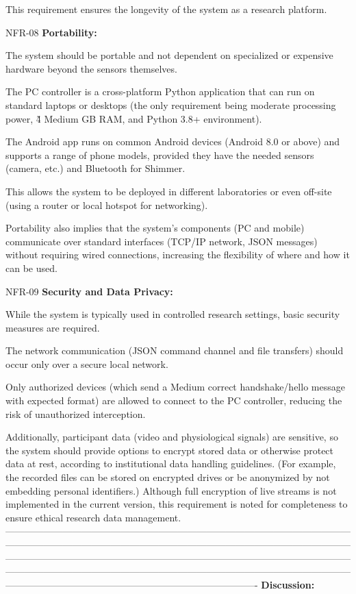 This requirement ensures the longevity of the system as a research platform.

NFR-08 \textbf{Portability:}

The system should be portable and not dependent on specialized or expensive hardware
beyond the sensors themselves.

The PC controller is a cross-platform Python application that can run on standard
laptops or desktops (the only requirement being moderate processing power, \~4 Medium
GB RAM, and Python 3.8+ environment).

The Android app runs on common Android devices (Android 8.0 or above) and supports a
range of phone models, provided they have the needed sensors (camera, etc.) and
Bluetooth for Shimmer.

This allows the system to be deployed in different laboratories or even off-site
(using a router or local hotspot for networking).

Portability also implies that the system's components (PC and mobile) communicate
over standard interfaces (TCP/IP network, JSON messages) without requiring wired
connections, increasing the flexibility of where and how it can be used.

NFR-09 \textbf{Security and Data Privacy:}

While the system is typically used in controlled research settings, basic security
measures are required.

The network communication (JSON command channel and file transfers) should occur only
over a secure local network.

Only authorized devices (which send a Medium correct handshake/hello message with
expected format) are allowed to connect to the PC controller, reducing the risk of
unauthorized interception.

Additionally, participant data (video and physiological signals) are sensitive, so
the system should provide options to encrypt stored data or otherwise protect data at
rest, according to institutional data handling guidelines.  (For example, the
recorded files can be stored on encrypted drives or be anonymized by not embedding
personal identifiers.) Although full encryption of live streams is not implemented in
the current version, this requirement is noted for completeness to ensure ethical
research data management.
-------------------------------------------------------------------------------------------------------------------------------------------------------------------------------------------------------------------------------------------------------------------------------------------------------------------------------------------------------------------------------------------------------------------------------------------------------------------------------------------------------------------------------
\textbf{Discussion:}

